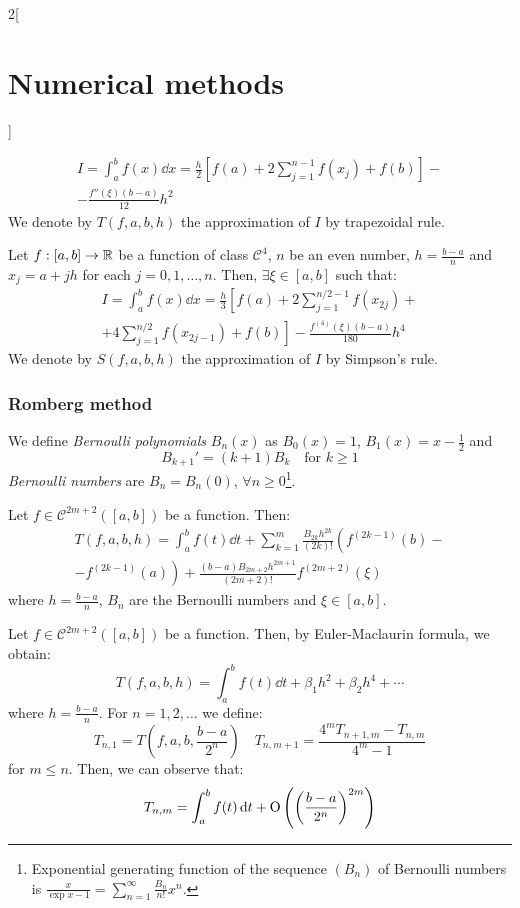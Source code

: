 \documentclass[../../../main_math.tex]{subfiles}
\begin{document}
\begin{multicols}{2}[\section{Numerical methods}]
\begin{theorem}
    \begin{multline*}
      I=\int_a^bf(x)\dd{x}=\frac{h}{2}\left[f(a)+2\sum_{j=1}^{n-1}f(x_j)+f(b)\right]-\\-\frac{f''(\xi)(b-a)}{12}h^2
    \end{multline*}
    We denote by $T(f,a,b,h)$ the approximation of $I$ by trapezoidal rule.
  \end{theorem}
  \begin{theorem}
    Let $f:[a,b]\rightarrow\mathbb{R}$ be a function of class $\mathcal{C}^4$, $n$ be an even number, $h=\frac{b-a}{n}$ and $x_j=a+jh$ for each $j=0,1,\ldots,n$. Then, $\exists\xi\in[a,b]$ such that:
    \begin{multline*}
      I=\int_a^bf(x)\dd{x}=\frac{h}{3}\left[f(a)+2\sum_{j=1}^{n/2-1}f(x_{2j})\right.+\\+\left.4\sum_{j=1}^{n/2}f(x_{2j-1})+f(b)\right]-\frac{f^{(4)}(\xi)(b-a)}{180}h^4
    \end{multline*}
    We denote by $S(f,a,b,h)$ the approximation of $I$ by Simpson's rule.
  \end{theorem}
  \subsubsection{Romberg method}
  \begin{definition}
    We define \emph{Bernoulli polynomials} $B_n(x)$ as $B_0(x)=1$, $B_1(x)=x-\frac{1}{2}$ and $$B_{k+1}'=(k+1)B_k\quad\text{for }k\geq 1$$ \emph{Bernoulli numbers} are $B_n=B_n(0)$, $\forall n\geq 0$\footnote{Exponential generating function of the sequence $(B_n)$ of Bernoulli numbers is $\displaystyle\frac{x}{\exp{x}-1}=\sum_{n=1}^\infty\frac{B_n}{n!}x^n$.}.
  \end{definition}
  \begin{theorem}
    Let $f\in\mathcal{C}^{2m+2}([a,b])$ be a function. Then:
    \begin{multline*}
      T(f,a,b,h)=\int_a^bf(t)\dd{t}+\sum_{k=1}^m\frac{B_{2k}h^{2k}}{(2k)!}\left(f^{(2k-1)}(b)\right.-\\-\left.f^{(2k-1)}(a)\right)+\frac{(b-a)B_{2m+2}h^{2m+1}}{(2m+2)!}f^{(2m+2)}(\xi)
    \end{multline*}
    where $h=\frac{b-a}{n}$, $B_n$ are the Bernoulli numbers and $\xi\in[a,b]$.
  \end{theorem}
  \begin{theorem}
    Let $f\in\mathcal{C}^{2m+2}([a,b])$ be a function. Then, by Euler-Maclaurin formula, we obtain: $$T(f,a,b,h)=\int_a^bf(t)\dd{t}+\beta_1 h^2+\beta_2 h^4+\cdots$$ where $h=\frac{b-a}{n}$. For $n=1,2,\ldots$ we define: $$T_{n,1}=T\left(f,a,b,\frac{b-a}{2^n}\right)\quad T_{n,m+1}=\frac{4^mT_{n+1,m}-T_{n,m}}{4^m-1}$$ for $m\leq n$. Then, we can observe that: $$T_{n,m}=\int_a^bf(t)\dd{t}+\mathrm{O}\left(\left(\frac{b-a}{2^n}\right)^{2m}\right)$$
  \end{theorem}

\end{multicols}
\end{document}
